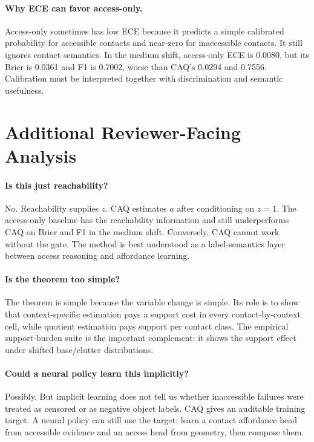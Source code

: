 \documentclass{article}
\newcommand{\gate}{z}
\newcommand{\aff}{a}
\begin{document}
\paragraph{Why ECE can favor access-only.}
Access-only sometimes has low ECE because it predicts a simple calibrated probability for accessible contacts and near-zero for inaccessible contacts. It still ignores contact semantics. In the medium shift, access-only ECE is 0.0080, but its Brier is 0.0361 and F1 is 0.7002, worse than CAQ's 0.0294 and 0.7556. Calibration must be interpreted together with discrimination and semantic usefulness.

\section{Additional Reviewer-Facing Analysis}

\paragraph{Is this just reachability?}
No. Reachability supplies $\gate$. CAQ estimates $\aff$ after conditioning on $\gate=1$. The access-only baseline has the reachability information and still underperforms CAQ on Brier and F1 in the medium shift. Conversely, CAQ cannot work without the gate. The method is best understood as a label-semantics layer between access reasoning and affordance learning.

\paragraph{Is the theorem too simple?}
The theorem is simple because the variable change is simple. Its role is to show that context-specific estimation pays a support cost in every contact-by-context cell, while quotient estimation pays support per contact class. The empirical support-burden suite is the important complement: it shows the support effect under shifted base/clutter distributions.

\paragraph{Could a neural policy learn this implicitly?}
Possibly. But implicit learning does not tell us whether inaccessible failures were treated as censored or as negative object labels. CAQ gives an auditable training target. A neural policy can still use the target: learn a contact affordance head from accessible evidence and an access head from geometry, then compose them.
\end{document}
